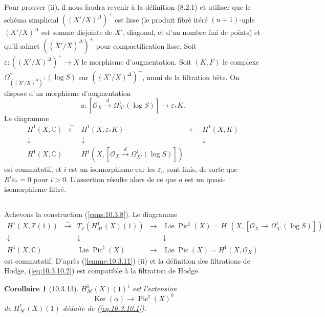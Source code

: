 \documentclass[12pt,a4paper]{amsart}
\theoremstyle{plain}
\newtheorem{corollaire}[lemme]{Corollaire}
\theoremstyle{definition}
\theoremstyle{remark}
\DeclareMathOperator{\Ker}{Ker}
\DeclareMathOperator{\Pic}{Pic}
\DeclareMathOperator{\Lie}{Lie}
\numberwithin{equation}{section}
\begin{document}
Pour prouver (ii), il nous faudra revenir à la définition (8.2.1) et utiliser que le schéma simplicial $((X'/X)^\Delta)^+$ est lisse (le produit fibré itéré $(n+1)$-uple $(X'/X)^\Delta$ est somme disjointe de $X'$, diagonal, et d'un nombre fini de points) et qu'il admet $((\overline{X}'/\overline{X})^\Delta)^+$ pour compactification lisse. Soit $\varepsilon:((X'/X)^\Delta)^+\to X$ le morphisme d'augmentation. Soit $(K,F)$ le complexe $\Omega_{((X'/X)^\Delta)^+}^*(\log S)$ sur $((X'/X)^\Delta)^+$, muni de la filtration bête. On dispose d'un morphisme d'augmentation
\[
a:[\mathcal{O}_X\xrightarrow{d}\Omega_{X'}^1(\log S)]\to\varepsilon_*K.
\]
Le diagramme
\[
\begin{array}{ccccc}
H^1(X,\mathbb{C}) & \xleftarrow{\sim} & H^1(X,\varepsilon_*K) & \longleftarrow & H^1(X,K) \\
\downarrow & & \downarrow & & \downarrow \\
H^1(X,\mathbb{C}) & & H^1(X,[\mathcal{O}_X\xrightarrow{d}\Omega_{X'}^1(\log S)]) & &
\end{array}
\]
est commutatif, et $i$ est un isomorphisme car les $\varepsilon_n$ sont finis, de sorte que $R^i\varepsilon_*=0$ pour $i>0$. L'assertion résulte alors de ce que $a$ est un quasi-isomorphisme filtré.

\subsection{}\label{10.3.12}
Achevons la construction (\ref{cons:10.3.8}). Le diagramme
\[
\begin{array}{ccccc}
H^1(X,\mathbb{Z}(1)) & \xrightarrow{\sim} & T_\mathbb{Z}(H_\mathscr{M}^1(X)(1)) & \longrightarrow & \Lie\Pic^\natural(X)=H^1(X,[\mathcal{O}_X\to\Omega_{X'}^1(\log S)]) \\
\downarrow & & \downarrow & & \downarrow \\
H^1(X,\mathbb{C}) & & \Lie\Pic^\natural(X) & \longrightarrow & \Lie\Pic(X)=H^1(X,\mathcal{O}_X)
\end{array}
\]
est commutatif. D'après (\ref{lemme:10.3.11}) (ii) et la définition des filtrations de Hodge, (\ref{eq:10.3.10.2}) est compatible à la filtration de Hodge.

\begin{corollaire}[10.3.13]\label{cor:10.3.13}
$H_\mathscr{M}^1(X)(1)^\natural$ est l'extension
\[
\Ker(\alpha)\to\Pic^\natural(X)^0
\]
de $H_\mathscr{M}^1(X)(1)$ déduite de (\ref{eq:10.3.10.1}).
\end{corollaire}
\end{document}

